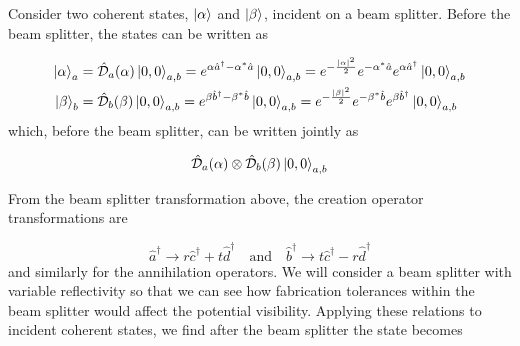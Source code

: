 
Consider two coherent states, $\ket{\alpha}$ and $\ket{\beta}$, incident on a beam splitter. Before the beam splitter, the states can be written as

\begin{align}
	\ket{\alpha}_a &= \hat{\mathcal{D}}_a(\alpha)\ket{0,0}_{a,b} = e^{\alpha \hat{a}^\dagger - \alpha^\ast \hat{a}}\ket{0,0}_{a,b} = e^{-\frac{|\alpha|^2}{2}} e^{-\alpha^\ast \hat{a}} e^{\alpha \hat{a}^\dagger}\ket{0,0}_{a,b}\\
	\ket{\beta}_b &= \hat{\mathcal{D}}_b(\beta)\ket{0,0}_{a,b} = e^{\beta \hat{b}^\dagger - \beta^\ast \hat{b}}\ket{0,0}_{a,b} = e^{-\frac{|\beta|^2}{2}} e^{-\beta^\ast \hat{b}} e^{\beta \hat{b}^\dagger}\ket{0,0}_{a,b}
\end{align}
which, before the beam splitter, can be written jointly as

\begin{equation}
	\hat{\mathcal{D}}_a(\alpha)\otimes\hat{\mathcal{D}}_b(\beta)\ket{0,0}_{a,b}
\end{equation}

%

From the beam splitter transformation above, the creation operator transformations are

\begin{equation}
	\hat{a}^\dagger \rightarrow r\hat{c}^\dagger + t\hat{d}^\dagger \quad \text{and} \quad \hat{b}^\dagger \rightarrow t\hat{c}^\dagger - r\hat{d}^\dagger
\end{equation}
and similarly for the annihilation operators. We will consider a beam splitter with variable reflectivity so that we can see how fabrication tolerances within the beam splitter would affect the potential visibility. Applying these relations to incident coherent states, we find after the beam splitter the state becomes

